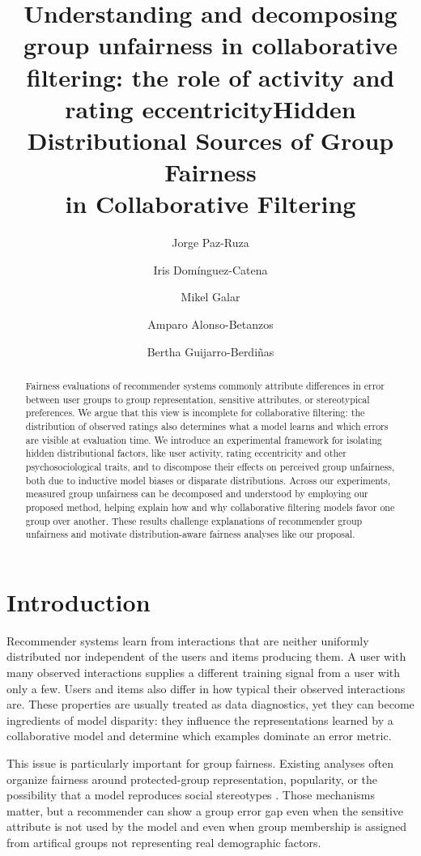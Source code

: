 \documentclass[11pt]{article}
\title{Understanding and decomposing group unfairness in collaborative filtering: the role of activity and rating eccentricity}
\title{Hidden Distributional Sources of Group Fairness\\
in Collaborative Filtering}
\author{Jorge Paz-Ruza \and Iris Domínguez-Catena \and Mikel Galar \and Amparo Alonso-Betanzos \and Bertha Guijarro-Berdiñas}
\date{}
\begin{document}
\maketitle

\begin{abstract}
Fairness evaluations of recommender systems commonly attribute differences in
error between user groups to group representation, sensitive attributes, or
stereotypical preferences. We argue that this view is incomplete for
collaborative filtering: the distribution of observed ratings also determines
what a model learns and which errors are visible at evaluation time. We
introduce an experimental framework for isolating hidden distributional
factors, like user activity, rating eccentricity and other psychosociological traits, and to discompose their effects on perceived group unfairness, both due to inductive model biases or disparate distributions. Across our experiments, measured group unfairness can be decomposed and understood by employing our proposed method, helping explain how and why collaborative filtering models favor one group over another. These
results challenge explanations of recommender group unfairness and motivate distribution-aware fairness analyses like our proposal.
\end{abstract}

\section{Introduction}
\label{sec:introduction}

Recommender systems learn from interactions that are neither uniformly
distributed nor independent of the users and items producing them. A user
with many observed interactions supplies a different training signal from a
user with only a few. Users and items also differ in how typical their
observed interactions are. These properties are usually treated as data
diagnostics, yet they can become ingredients of model disparity: they
influence the representations learned by a collaborative model and determine
which examples dominate an error metric.

This issue is particularly important for group fairness. Existing analyses
often organize fairness around protected-group representation, popularity, or
the possibility that a model reproduces social stereotypes
\cite{dwork2012,ekstrand2018,burke2017,mehrabi2021}. Those mechanisms matter,
but a recommender can show a group error gap even when the sensitive attribute
is not used by the model and even when group membership is assigned from artifical groups not representing real demographic factors.
\end{document}
